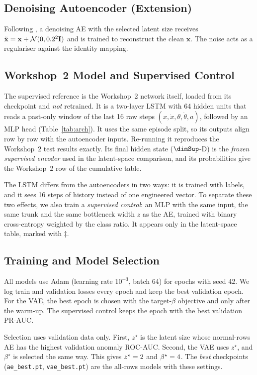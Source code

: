 \documentclass[conference]{IEEEtran}
\begin{document}
\subsection{Denoising Autoencoder (Extension)}
Following \cite{vincent2010}, a denoising AE with the selected latent size receives
$\tilde{\mathbf x}=\mathbf x+\mathcal N(0,0.2^2\mathbf I)$ and is trained to reconstruct
the clean $\mathbf x$. The noise acts as a regulariser against the identity mapping.

\subsection{Workshop~2 Model and Supervised Control}
The supervised reference is the Workshop~2 network itself, loaded from its checkpoint and
\emph{not} retrained. It is a two-layer LSTM with 64 hidden units that reads a past-only
window of the last 16 raw steps $(x,\dot x,\theta,\dot\theta,a)$, followed by an MLP head
(Table~\ref{tab:arch}). It uses the same episode split, so its outputs align row by row with
the autoencoder inputs. Re-running it reproduces the Workshop~2 test results exactly. Its
final hidden state ($\dimSup$-D) is the \emph{frozen supervised encoder} used in the
latent-space comparison, and its probabilities give the Workshop~2 row of the cumulative
table.

The LSTM differs from the autoencoders in two ways: it is trained with labels, and it sees
16 steps of history instead of one engineered vector. To separate these two effects, we also
train a \emph{supervised control}: an MLP with the same input, the same trunk and the same
bottleneck width $z$ as the AE, trained with binary cross-entropy weighted by the class ratio.
It appears only in the latent-space table, marked with $\ddagger$.

\subsection{Training and Model Selection}
All models use Adam \cite{kingma2015} (learning rate $10^{-3}$, batch 64) for \epochs{}
epochs with seed 42. We log train and validation losses every epoch and keep the best
validation epoch. For the VAE, the best epoch is chosen with the target-$\beta$ objective and
only after the warm-up. The supervised control keeps the epoch with the best validation
PR-AUC.

Selection uses validation data only. First, $z^\star$ is the latent size whose
normal-rows AE has the highest validation anomaly ROC-AUC. Second, the VAE uses $z^\star$,
and $\beta^\star$ is selected the same way. This gives $z^\star=2$ and
$\beta^\star=4$. The \emph{best} checkpoints (\texttt{ae\_best.pt},
\texttt{vae\_best.pt}) are the all-rows models with these settings.
\end{document}
